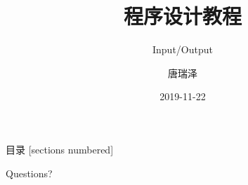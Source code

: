 \documentclass[10pt]{beamer}
\title{程序设计教程}
\subtitle{Input/Output}
\date{2019-11-22}
\author{唐瑞泽}
\institute{tangruize@smail.nju.edu.cn}
\begin{document}
    \maketitle

    \begin{frame}{目录}
        [sections numbered]
        \tableofcontents[hideallsubsections]
    \end{frame}

    

    

    \begin{frame}[standout]
        Questions?
    \end{frame}
\end{document}
